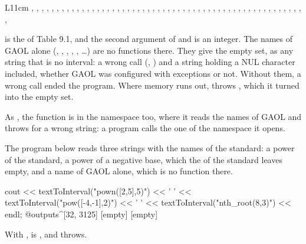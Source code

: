 \documentclass[12pt,a4paper,twoside,openright]{book}
\begin{document}
\begin{center}\small
\begin{tabular}{L{11cm}}
, , , , , ,
, , , , , ,
, , , , , ,
, , , , , ,
, , , , ,
, , , , ,
, , , ,
, , , , ,
, , , ,
, , , , ,
, , , \\
\end{tabular}
\end{center}

\noindent
{} is the  of Table 9.1, and the second argument of
 and  is an integer. The names of GAOL alone
(, , , ,
, \ldots) are no functions there.
They give the empty set, as any string that is no interval: a wrong call
(, ) and a string holding a NUL
character included, whether GAOL was configured with exceptions or
not.\newinvfive{} Without them, a wrong call ended the program. Where memory
runs out,  throws , which it
turned into the empty set.

\medskip
As , the function  is in the namespace
 too, where it reads the names of GAOL and throws
 for a wrong string: a program calls the one of
the namespace it opens.

\begin{Ex}\label{ex:ieee1788-text}
The program below reads three strings with the names of the standard: a
power of the standard, a power of a negative base, which the  of
the standard leaves empty, and a name of GAOL alone, which is no function
there.
\begin{example}
cout << textToInterval("pown([2,5],5)") << ' '
     << textToInterval("pow([-4,-1],2)") << ' '
     << textToInterval("nth_root(8,3)") << endl;
@outputs^[32, 3125] [empty] [empty]~
\end{example}
With , 
is , and  throws.
\end{Ex}
\end{document}
